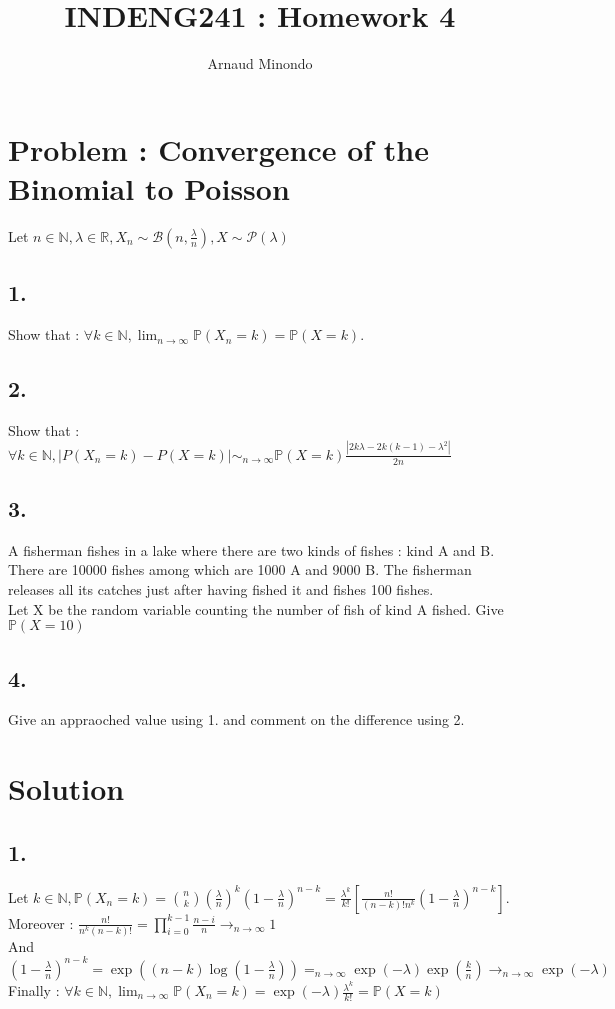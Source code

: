 \documentclass{article}
\title{INDENG241 : Homework 4}
\author{Arnaud Minondo}
\begin{document}
\maketitle
\section*{Problem : Convergence of the Binomial to Poisson}
Let $n\in\mathbb{N}, \lambda\in\mathbb{R}, X_n \sim \mathcal{B}(n,\frac{\lambda}{n}), X \sim \mathcal{P}(\lambda)$
\subsection*{1.}
Show that : $\forall k \in\mathbb{N}, \lim_{n\to\infty} \mathbb{P}(X_n = k) = \mathbb{P}(X = k)$.
\subsection*{2.}
Show that : $\forall k \in \mathbb{N} , |P(X_n=k)-P(X=k)|\sim_{n\to\infty} \mathbb{P}(X=k)\frac{|2k\lambda-2k(k-1)-\lambda^2|}{2n}$
\subsection*{3.}
A fisherman fishes in a lake where there are two kinds of fishes : kind A and B.
There are 10000 fishes among which are 1000 A and 9000 B.
The fisherman releases all its catches just after having fished it and fishes 100 fishes.\\
Let X be the random variable counting the number of fish of kind A fished. 
Give $\mathbb{P}(X=10)$
\subsection*{4.}
Give an appraoched value using 1. and comment on the difference using 2.

\section*{Solution}
\subsection*{1.}
Let $k\in\mathbb{N}, \mathbb{P}(X_n = k) = \binom{n}{k}(\frac{\lambda}{n})^k(1-\frac{\lambda}{n})^{n-k} = \frac{\lambda^k}{k!}\left[\frac{n!}{(n-k)!n^k}(1-\frac{\lambda}{n})^{n-k}\right]$.
\\
Moreover : $\frac{n!}{n^k(n-k)!} = \prod_{i=0}^{k-1}\frac{n-i}{n} \to_{n\to \infty} 1$
\\
And $(1-\frac{\lambda}{n})^{n-k} = \exp((n-k)\log(1-\frac{\lambda}{n})) =_{n\to \infty} \exp(-\lambda)\exp(\frac{k}{n})\to_{n\to\infty} \exp(-\lambda) $
\\
Finally : $\forall k \in \mathbb{N}, \lim_{n\to\infty} \mathbb{P}(X_n=k)= \exp (-\lambda) \frac{\lambda^k}{k!} = \mathbb{P}(X=k)$
\end{document}

